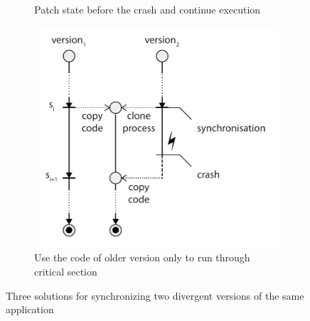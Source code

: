 \begin{figure}[!t]
\begin{center}
\begin{subfigure}[b]{0.45\textwidth}
      \caption{Patch state before the crash and continue execution}
      \label{fig:recovery-solution2}
    \end{subfigure}
    \quad
    \begin{subfigure}[b]{0.45\textwidth}
      \includegraphics[width=\textwidth]{multi-version/figures/solution3}
      \caption{Use the code of older version only to run through critical section}
      \label{fig:recovery-solution3}
    \end{subfigure}
    \caption{Three solutions for synchronizing two divergent versions of the same application}
    \label{fig:recovery-solutions}
  \end{center}
\end{figure}

